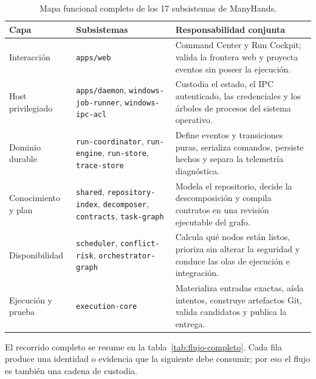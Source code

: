 \begin{table}[htbp]
  \centering
  \caption{Mapa funcional completo de los 17 subsistemas de ManyHands.}
  \label{tab:mapa-sistema}
  \scriptsize
  \begin{tabularx}{\textwidth}{@{}p{2.45cm} p{5.3cm} X@{}}
    \toprule
    \textbf{Capa} & \textbf{Subsistemas} & \textbf{Responsabilidad conjunta} \\
    \midrule
    Interacción & \texttt{apps/web} & Command Center y Run Cockpit; valida la frontera web y proyecta eventos sin poseer la ejecución. \\
    Host privilegiado & \texttt{apps/daemon}, \texttt{windows-job-runner}, \texttt{windows-ipc-acl} & Custodia el estado, el IPC autenticado, las credenciales y los árboles de procesos del sistema operativo. \\
    Dominio durable & \texttt{run-coordinator}, \texttt{run-engine}, \texttt{run-store}, \texttt{trace-store} & Define eventos y transiciones puras, serializa comandos, persiste hechos y separa la telemetría diagnóstica. \\
    Conocimiento y plan & \texttt{shared}, \texttt{repository-index}, \texttt{decomposer}, \texttt{contracts}, \texttt{task-graph} & Modela el repositorio, decide la descomposición y compila contratos en una revisión ejecutable del grafo. \\
    Disponibilidad & \texttt{scheduler}, \texttt{conflict-risk}, \texttt{orchestrator-graph} & Calcula qué nodos están listos, prioriza sin alterar la seguridad y conduce las olas de ejecución e integración. \\
    Ejecución y prueba & \texttt{execution-core} & Materializa entradas exactas, aísla intentos, construye artefactos Git, valida candidatos y publica la entrega. \\
    \bottomrule
  \end{tabularx}
\end{table}

El recorrido completo se resume en la tabla~\ref{tab:flujo-completo}. Cada fila
produce una identidad o evidencia que la siguiente debe consumir; por eso el
flujo es también una cadena de custodia.

